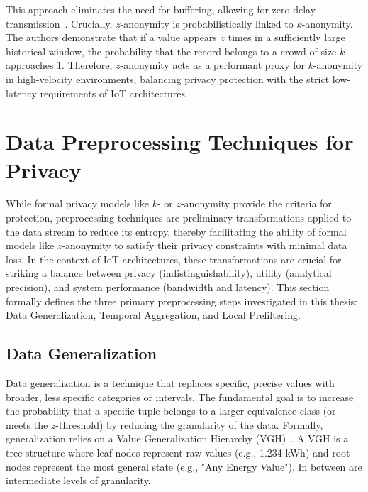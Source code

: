 This approach eliminates the need for buffering, allowing for zero-delay transmission~\cite{zanonDataStreams}. Crucially, $z$-anonymity is probabilistically linked to $k$-anonymity. The authors demonstrate that if a value appears $z$ times in a sufficiently large historical window, the probability that the record belongs to a crowd of size $k$ approaches 1. Therefore, $z$-anonymity acts as a performant proxy for $k$-anonymity in high-velocity environments, balancing privacy protection with the strict low-latency requirements of \ac{IoT} architectures.



\section{Data Preprocessing Techniques for Privacy}

While formal privacy models like $k$- or $z$-anonymity provide the criteria for protection, preprocessing techniques are preliminary transformations applied to the data stream to reduce its entropy, thereby facilitating the ability of formal models like $z$-anonymity to satisfy their privacy constraints with minimal data loss. In the context of \ac{IoT} architectures, these transformations are crucial for striking a balance between privacy (indistinguishability), utility (analytical precision), and system performance (bandwidth and latency). This section formally defines the three primary preprocessing steps investigated in this thesis: Data Generalization, Temporal Aggregation, and Local Prefiltering.

\subsection{Data Generalization}
Data generalization is a technique that replaces specific, precise values with broader, less specific categories or intervals. The fundamental goal is to increase the probability that a specific tuple belongs to a larger equivalence class (or meets the $z$-threshold) by reducing the granularity of the data.
Formally, generalization relies on a Value Generalization Hierarchy (VGH)~\cite{DataGeneralizationPaper}. A VGH is a tree structure where leaf nodes represent raw values (e.g., 1.234 kWh) and root nodes represent the most general state (e.g., "Any Energy Value"). In between are intermediate levels of granularity.

